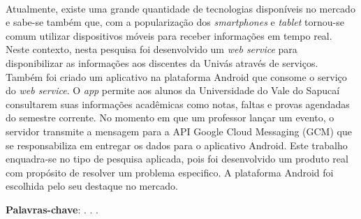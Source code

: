 
\begin{OnehalfSpacing} 


\vspace{\onelineskip}
\vspace{\onelineskip}
\vspace{\onelineskip}
\vspace{\onelineskip}

\begin{resumo}
~\\
\noindent Atualmente, existe uma grande quantidade de tecnologias disponíveis
no mercado e sabe-se também que, com a popularização dos \textit{smartphones} e
\textit{tablet} tornou-se comum utilizar dispositivos móveis para receber
informações em tempo real. Neste contexto, nesta pesquisa foi desenvolvido um
\textit{web service} para disponibilizar as informações aos discentes da Univás
através de serviços. Também foi criado um aplicativo na plataforma Android que
consome o serviço do \textit{web service}. O \textit{app} permite aos alunos da
Universidade do Vale do Sapucaí consultarem suas informações acadêmicas como
notas, faltas e provas agendadas do semestre corrente. No momento em que um
professor lançar um evento, o servidor transmite a mensagem para a API Google
Cloud Messaging (GCM) que se responsabiliza em entregar os dados para o
aplicativo Android. Este trabalho enquadra-se no tipo de pesquisa aplicada,
pois foi desenvolvido um produto real com propósito de resolver um problema
especifico. A plataforma Android foi escolhida pelo seu destaque no mercado.

\vspace{\onelineskip}
\vspace*{\fill}
\noindent \textbf{Palavras-chave}: \imprimirPalavraChaveUm. \imprimirPalavraChaveDois. \imprimirPalavraChaveTres.
\vspace{\onelineskip}
\end{resumo}

\end{OnehalfSpacing}
